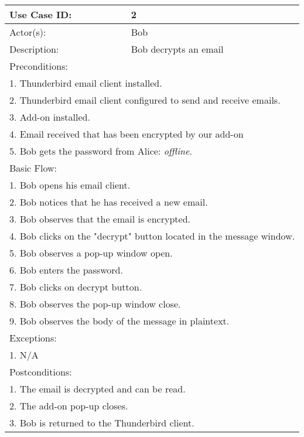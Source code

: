 \begin{longtable} {|p{3cm}|p{9cm}|} %
	\hline
Use Case ID: & 2\\
	\hline
Actor(s): & Bob \\
	\hline
Description: & Bob decrypts an email \\
	\hline
	\multicolumn{2}{|l|}{Preconditions:} \\
	\multicolumn{2}{|l|}{1. Thunderbird email client installed.} \\
	\multicolumn{2}{|l|}{2. Thunderbird email client configured to send and receive emails.}\\
	\multicolumn{2}{|l|}{3. Add-on installed.} \\
	\multicolumn{2}{|l|}{4. Email received that has been encrypted by our add-on} \\
	\multicolumn{2}{|l|}{5. Bob gets the password from Alice: \emph{offline}.}\\
	\hline
	\multicolumn{2}{|l|}{Basic Flow:} \\
	\multicolumn{2}{|l|}{1. Bob opens his email client.}\\
	\multicolumn{2}{|l|}{2. Bob notices that he has received a new email.} \\
	\multicolumn{2}{|l|}{3. Bob observes that the email is encrypted.} \\
	\multicolumn{2}{|l|}{4. Bob clicks on the "decrypt" button located in the message window.}\\
	\multicolumn{2}{|l|}{5. Bob observes a pop-up window open.} \\
	\multicolumn{2}{|l|}{6. Bob enters the password.} \\
	\multicolumn{2}{|l|}{7. Bob clicks on decrypt button.} \\
	\multicolumn{2}{|l|}{8. Bob observes the pop-up window close.} \\
	\multicolumn{2}{|l|}{9. Bob observes the body of the message in plaintext.} \\
	\hline
	\hline
	\multicolumn{2}{|l|}{Exceptions:} \\
	\multicolumn{2}{|l|}{1. N/A} \\
	\hline
	\hline
	\multicolumn{2}{|l|}{Postconditions:} \\
	\multicolumn{2}{|l|}{1. The email is decrypted and can be read.} \\
	\multicolumn{2}{|l|}{2. The add-on pop-up closes.} \\
	\multicolumn{2}{|l|}{3. Bob is returned to the Thunderbird client.} \\
	\hline
\end{longtable}

